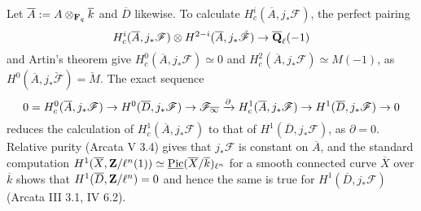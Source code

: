 \documentclass[deligne.tex]{subfiles}
\begin{document}
Let $\overline A:=A\otimes_{\mathbf{F}_q}\overline k$ and $\overline D$ likewise.
To calculate $H^i_c(\overline A,j_*\mathscr F)$, the perfect pairing
\begin{equation*}
	H^i_c(\overline A,j_*\mathscr F)\otimes H^{2-i}(\overline A,j_*\check{\mathscr F})\rightarrow\overline{\mathbf{Q}}_\ell(-1)
\end{equation*}
and Artin's theorem give $H^0_c(\overline A,j_*\mathscr F)\simeq0$ and
$H^2_c(\overline A,j_*\mathscr F)\simeq M(-1)$,
as $H^0(\overline A,j_*\check{\mathscr F})=\check M$.
The exact sequence
\begin{equation*}
	0=H_c^0(\overline A,j_*\mathscr F)\rightarrow H^0(\overline D,j_*\mathscr F)
	\rightarrow\mathscr F_{\overline\infty}\xrightarrow\partial H_c^1(\overline A,j_*\mathscr F)
	\rightarrow H^1(\overline D,j_*\mathscr F)\rightarrow0
\end{equation*}
reduces the calculation of $H^1_c(\overline A,j_*\mathscr F)$ to that of
$H^1(\overline D,j_*\mathscr F)$, as $\partial=0$.
Relative purity (Arcata V 3.4) gives that 
$j_*\mathscr F$ is constant on $\overline A$, and the standard computation
$H^1(\overline X,\mathbf{Z}/\ell^n(1))\simeq\underline{\operatorname{Pic}}(\overline X/\overline k)_{\ell^n}$ for a smooth connected curve
$\overline X$ over $\overline k$ shows that $H^1(\overline D,\mathbf{Z}/\ell^n)=0$
and hence the same is true for $H^1(\overline D,j_*\mathscr F)$
(Arcata III 3.1, IV 6.2).
\end{document}
